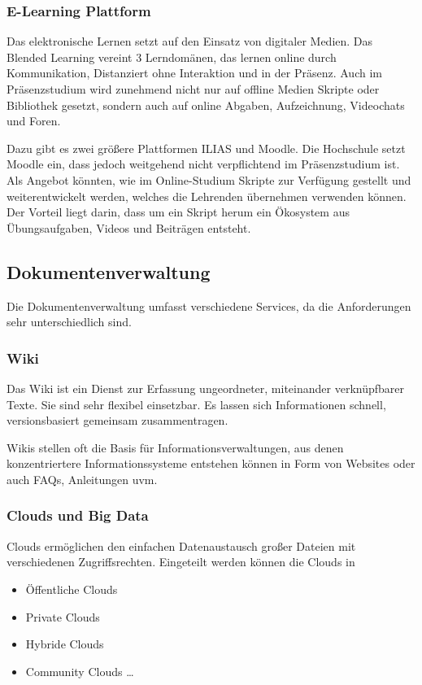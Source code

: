 \subsubsection{E-Learning Plattform}
\label{subsubsection_e_learning_plattformen}
Das elektronische Lernen setzt auf den Einsatz von digitaler Medien.
Das Blended Learning vereint 3 Lerndomänen, das lernen online durch Kommunikation, Distanziert ohne Interaktion und in der Präsenz. Auch im Präsenzstudium wird zunehmend nicht nur auf offline Medien Skripte oder Bibliothek gesetzt, sondern auch auf online Abgaben, Aufzeichnung, Videochats und Foren.

Dazu gibt es zwei größere Plattformen ILIAS und Moodle. Die Hochschule setzt Moodle ein, dass jedoch weitgehend nicht verpflichtend im Präsenzstudium ist. Als Angebot könnten, wie im Online-Studium Skripte zur Verfügung gestellt und weiterentwickelt werden, welches die Lehrenden übernehmen verwenden können. Der Vorteil liegt darin, dass um ein Skript herum ein Ökosystem aus Übungsaufgaben, Videos und Beiträgen entsteht.


\subsection{Dokumentenverwaltung}
Die Dokumentenverwaltung umfasst verschiedene Services, da die Anforderungen sehr unterschiedlich sind.


\subsubsection{Wiki}
Das Wiki ist ein Dienst zur Erfassung ungeordneter, miteinander verknüpfbarer Texte. Sie sind sehr flexibel einsetzbar. Es lassen sich Informationen schnell, versionsbasiert gemeinsam zusammentragen.

Wikis stellen oft die Basis für Informationsverwaltungen, aus denen konzentriertere Informationssysteme entstehen können in Form von Websites oder auch FAQs, Anleitungen uvm.



\subsubsection{Clouds und Big Data}
Clouds ermöglichen den einfachen Datenaustausch großer Dateien mit verschiedenen Zugriffsrechten. Eingeteilt werden können die Clouds in


\begin{itemize}
  \item Öffentliche Clouds
  \item Private Clouds
  \item Hybride Clouds
  \item Community Clouds \ldots
\end{itemize}

